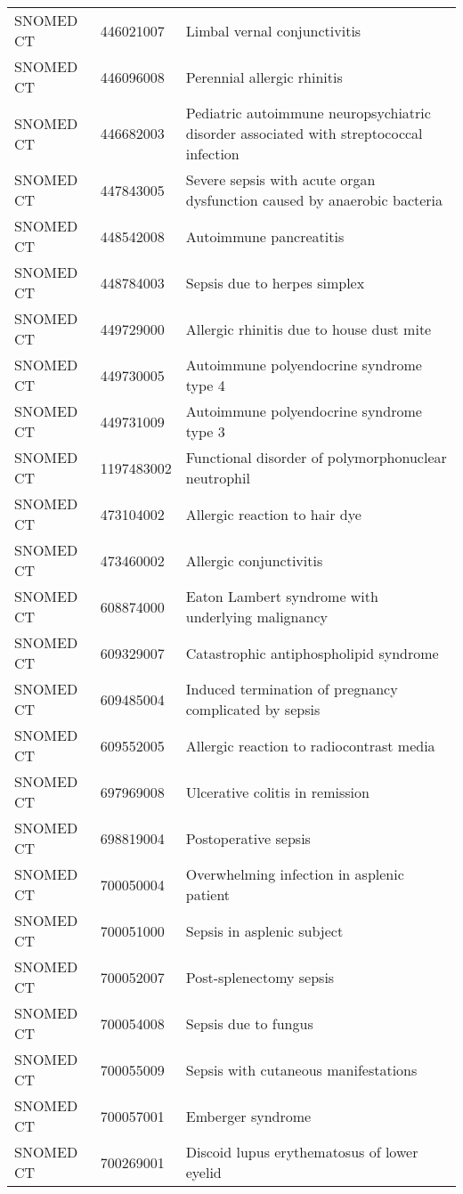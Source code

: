 \begin{longtable}{p{}p{}p{}}
  SNOMED CT & 446021007 & Limbal vernal conjunctivitis \\ 
  SNOMED CT & 446096008 & Perennial allergic rhinitis \\ 
  SNOMED CT & 446682003 & Pediatric autoimmune neuropsychiatric disorder associated with streptococcal infection \\ 
  SNOMED CT & 447843005 & Severe sepsis with acute organ dysfunction caused by anaerobic bacteria \\ 
  SNOMED CT & 448542008 & Autoimmune pancreatitis \\ 
  SNOMED CT & 448784003 & Sepsis due to herpes simplex \\ 
  SNOMED CT & 449729000 & Allergic rhinitis due to house dust mite \\ 
  SNOMED CT & 449730005 & Autoimmune polyendocrine syndrome type 4 \\ 
  SNOMED CT & 449731009 & Autoimmune polyendocrine syndrome type 3 \\ 
  SNOMED CT & 1197483002 & Functional disorder of polymorphonuclear neutrophil \\ 
  SNOMED CT & 473104002 & Allergic reaction to hair dye \\ 
  SNOMED CT & 473460002 & Allergic conjunctivitis \\ 
  SNOMED CT & 608874000 & Eaton Lambert syndrome with underlying malignancy \\ 
  SNOMED CT & 609329007 & Catastrophic antiphospholipid syndrome \\ 
  SNOMED CT & 609485004 & Induced termination of pregnancy complicated by sepsis \\ 
  SNOMED CT & 609552005 & Allergic reaction to radiocontrast media \\ 
  SNOMED CT & 697969008 & Ulcerative colitis in remission \\ 
  SNOMED CT & 698819004 & Postoperative sepsis \\ 
  SNOMED CT & 700050004 & Overwhelming infection in asplenic patient \\ 
  SNOMED CT & 700051000 & Sepsis in asplenic subject \\ 
  SNOMED CT & 700052007 & Post-splenectomy sepsis \\ 
  SNOMED CT & 700054008 & Sepsis due to fungus \\ 
  SNOMED CT & 700055009 & Sepsis with cutaneous manifestations \\ 
  SNOMED CT & 700057001 & Emberger syndrome \\ 
  SNOMED CT & 700269001 & Discoid lupus erythematosus of lower eyelid \\ 

\end{longtable}

